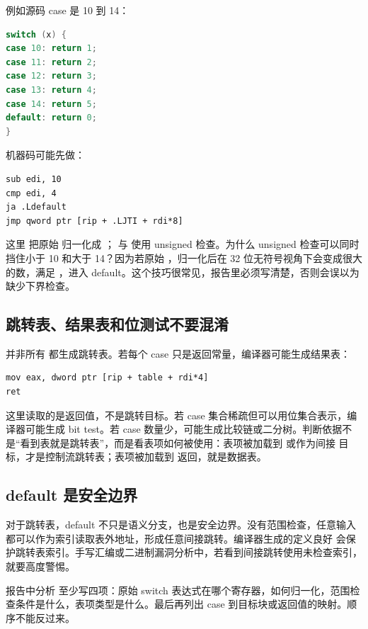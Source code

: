 例如源码 case 是 10 到 14：

\begin{lstlisting}[language=C++]
switch (x) {
case 10: return 1;
case 11: return 2;
case 12: return 3;
case 13: return 4;
case 14: return 5;
default: return 0;
}
\end{lstlisting}

机器码可能先做：

\begin{lstlisting}
sub edi, 10
cmp edi, 4
ja .Ldefault
jmp qword ptr [rip + .LJTI + rdi*8]
\end{lstlisting}

这里  把原始  归一化成 ； 与  使用 unsigned 检查。为什么 unsigned 检查可以同时挡住小于 10 和大于 14？因为若原始 ，归一化后在 32 位无符号视角下会变成很大的数，满足 ，进入 default。这个技巧很常见，报告里必须写清楚，否则会误以为缺少下界检查。

\subsection{跳转表、结果表和位测试不要混淆}

并非所有  都生成跳转表。若每个 case 只是返回常量，编译器可能生成结果表：

\begin{lstlisting}
mov eax, dword ptr [rip + table + rdi*4]
ret
\end{lstlisting}

这里读取的是返回值，不是跳转目标。若 case 集合稀疏但可以用位集合表示，编译器可能生成 bit test。若 case 数量少，可能生成比较链或二分树。判断依据不是“看到表就是跳转表”，而是看表项如何被使用：表项被加载到  或作为间接  目标，才是控制流跳转表；表项被加载到  返回，就是数据表。

\subsection{default 是安全边界}

对于跳转表，default 不只是语义分支，也是安全边界。没有范围检查，任意输入都可以作为索引读取表外地址，形成任意间接跳转。编译器生成的定义良好  会保护跳转表索引。手写汇编或二进制漏洞分析中，若看到间接跳转使用未检查索引，就要高度警惕。

报告中分析  至少写四项：原始 switch 表达式在哪个寄存器，如何归一化，范围检查条件是什么，表项类型是什么。最后再列出 case 到目标块或返回值的映射。顺序不能反过来。


